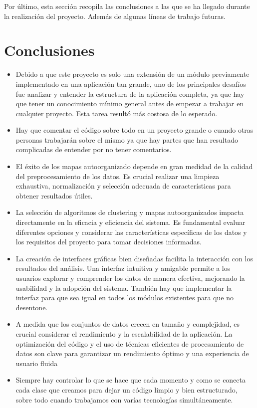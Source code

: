 
Por último, esta sección recopila las conclusiones a las que se ha llegado durante la realización del proyecto. Además de algunas líneas de trabajo futuras.

\section{Conclusiones}

\begin{itemize}
    \item Debido a que este proyecto es solo una extensión de un módulo previamente implementado en una aplicación tan grande, uno de los principales desafíos fue analizar y entender la estructura de la aplicación completa, ya que hay que tener un conocimiento mínimo general antes de empezar a trabajar en cualquier proyecto. Esta tarea resultó más costosa de lo esperado.
    \item Hay que comentar el código sobre todo en un proyecto grande o cuando otras personas trabajarán sobre el mismo ya que hay partes que han resultado complicadas de entender por no tener comentarios. 
    \item El éxito de los mapas autoorganizado depende en gran medidad de la calidad del preprocesamiento de los datos. Es crucial realizar una limpieza exhaustiva, normalización y selección adecuada de características para obtener resultados útiles.
    \item La selección de algoritmos de clustering y mapas autoorganizados impacta directamente en la eficacia y eficiencia del sistema. Es fundamental evaluar diferentes opciones y considerar las características específicas de los datos y los requisitos del proyecto para tomar decisiones informadas.
    \item La creación de interfaces gráficas bien diseñadas facilita la interacción con los resultados del análisis. Una interfaz intuitiva y amigable permite a los usuarios explorar y comprender los datos de manera efectiva, mejorando la usabilidad y la adopción del sistema. También hay que implementar la interfaz para que sea igual en todos los módulos existentes para que no desentone.
    \item A medida que los conjuntos de datos crecen en tamaño y complejidad, es crucial considerar el rendimiento y la escalabilidad de la aplicación. La optimización del código y el uso de técnicas eficientes de procesamiento de datos son clave para garantizar un rendimiento óptimo y una experiencia de usuario fluida
    \item Siempre hay controlar lo que se hace que cada momento y como se conecta cada clase que creamos para dejar un código limpio y bien estructurado, sobre todo cuando trabajamos con varías tecnologías simultáneamente.
\end{itemize}

